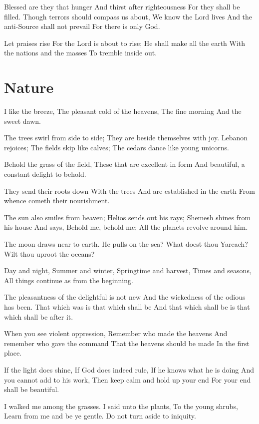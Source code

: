 \documentclass[
]{book}
\begin{document}
Blessed are they that hunger
And thirst after righteousness
For they shall be filled.
Though terrors should compass us about,
We know the Lord lives
And the anti-Source shall not prevail
For there is only God.

Let praises rise
For the Lord is about to rise;
He shall make all the earth
With the nations and the masses
To tremble inside out.

\chapter{Nature}\label{nature}

I like the breeze,
The pleasant cold of the heavens,
The fine morning
And the sweet dawn.

The trees swirl from side to side;
They are beside themselves with joy.
Lebanon rejoices;
The fields skip like calves;
The cedars dance like young unicorns.

Behold the grass of the field,
These that are excellent in form
And beautiful, a constant delight to behold.

They send their roots down
With the trees
And are established in the earth
From whence cometh their nourishment.

The sun also smiles from heaven;
Helios sends out his rays;
Shemesh shines from his house
And says, Behold me, behold me;
All the planets revolve around him.

The moon draws near to earth.
He pulls on the sea?
What doest thou Yareach?
Wilt thou uproot the oceans?

Day and night,
Summer and winter,
Springtime and harvest,
Times and seasons,
All things continue as from the beginning.

The pleasantness of the delightful is not new
And the wickedness of the odious has been.
That which was is that which shall be
And that which shall be is that which shall be after it.

When you see violent oppression,
Remember who made the heavens
And remember who gave the command
That the heavens should be made
In the first place.

If the light does shine,
If God does indeed rule,
If he knows what he is doing
And you cannot add to his work,
Then keep calm and hold up your end
For your end shall be beautiful.

I walked me among the grasses.
I said unto the plants,
To the young shrubs,
Learn from me and be ye gentle.
Do not turn aside to iniquity.
\end{document}
